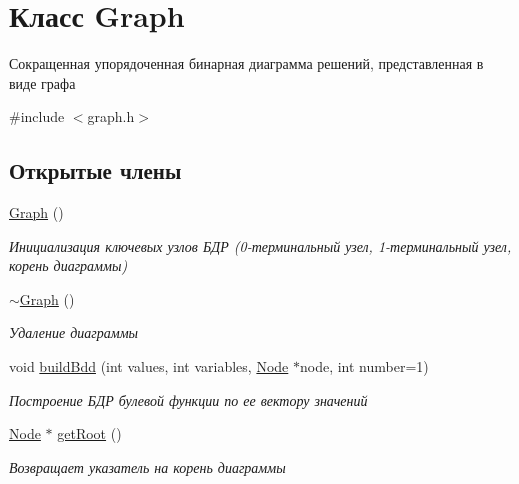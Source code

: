 \hypertarget{class_graph}{}\section{Класс Graph}
\label{class_graph}


Сокращенная упорядоченная бинарная диаграмма решений, представленная в виде графа  




{\ttfamily \#include $<$graph.\+h$>$}

\subsection*{Открытые члены}
\begin{DoxyCompactItemize}
\item 
\hyperlink{class_graph_ae4c72b8ac4d693c49800a4c7e273654f}{Graph} ()\hypertarget{class_graph_ae4c72b8ac4d693c49800a4c7e273654f}{}\label{class_graph_ae4c72b8ac4d693c49800a4c7e273654f}

\begin{DoxyCompactList}\small\item\em Инициализация ключевых узлов БДР (0-\/терминальный узел, 1-\/терминальный узел, корень диаграммы) \end{DoxyCompactList}\item 
\hyperlink{class_graph_a902c5b3eacb66d60752525ab23297a95}{$\sim$\+Graph} ()\hypertarget{class_graph_a902c5b3eacb66d60752525ab23297a95}{}\label{class_graph_a902c5b3eacb66d60752525ab23297a95}

\begin{DoxyCompactList}\small\item\em Удаление диаграммы \end{DoxyCompactList}\item 
void \hyperlink{class_graph_a2a51a5b554d072c8fcfa934cabf08779}{build\+Bdd} (int values, int variables, \hyperlink{class_node}{Node} $\ast$node, int number=1)
\begin{DoxyCompactList}\small\item\em Построение БДР булевой функции по ее вектору значений \end{DoxyCompactList}\item 
\hyperlink{class_node}{Node} $\ast$ \hyperlink{class_graph_aa706260b27686591003a41c2b8c42644}{get\+Root} ()\hypertarget{class_graph_aa706260b27686591003a41c2b8c42644}{}\label{class_graph_aa706260b27686591003a41c2b8c42644}

\begin{DoxyCompactList}\small\item\em Возвращает указатель на корень диаграммы \end{DoxyCompactList}\end{DoxyCompactItemize}


